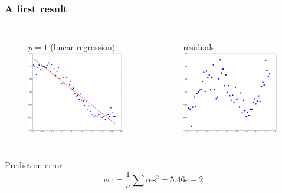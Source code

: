 \documentclass[handout]{beamer}
\begin{document}
\begin{frame}
\frametitle{A first result}
\vspace{-2em}
\begin{columns}[t]
\begin{figure}
$p=1$ (linear regression)\\
\includegraphics[width=0.99\textwidth]{./fig/L1/linreg_pow1.png}
\end{figure}
\begin{figure}
residuals\\
\includegraphics[width=0.99\textwidth]{./fig/L1/residuals.png}
\end{figure}

\end{columns}
\begin{block}{Prediction error}
$$
\text{err} = \frac{1}{n}\sum \text{res}^2 = 5.46e-2
$$
\end{block}

\end{frame}
\end{document}
